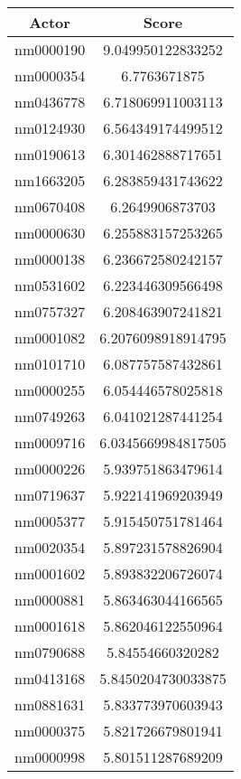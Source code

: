 \begin{table}[H]
    \centering
        \begin{tabular}{ |c|c| } 
            \hline
            \textbf{Actor} & \textbf{Score} \\ 
            \hline 
            nm0000190 & 9.049950122833252 \\
            nm0000354 & 6.7763671875 \\
            nm0436778 & 6.718069911003113 \\
            nm0124930 & 6.564349174499512 \\
            nm0190613 & 6.301462888717651 \\
            nm1663205 & 6.283859431743622 \\
            nm0670408 & 6.2649906873703 \\
            nm0000630 & 6.255883157253265 \\
            nm0000138 & 6.236672580242157 \\
            nm0531602 & 6.223446309566498 \\
            nm0757327 & 6.208463907241821 \\
            nm0001082 & 6.2076098918914795 \\
            nm0101710 & 6.087757587432861 \\
            nm0000255 & 6.054446578025818 \\
            nm0749263 & 6.041021287441254 \\
            nm0009716 & 6.0345669984817505 \\
            nm0000226 & 5.939751863479614 \\
            nm0719637 & 5.922141969203949 \\
            nm0005377 & 5.915450751781464 \\
            nm0020354 & 5.897231578826904 \\
            nm0001602 & 5.893832206726074 \\
            nm0000881 & 5.863463044166565 \\
            nm0001618 & 5.862046122550964 \\
            nm0790688 & 5.84554660320282 \\
            nm0413168 & 5.8450204730033875 \\
            nm0881631 & 5.833773970603943 \\
            nm0000375 & 5.821726679801941 \\
            nm0000998 & 5.801511287689209 \\

\end{tabular}
\end{table}
